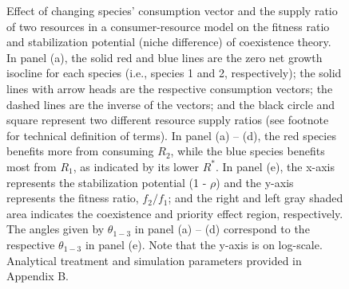 \newpage
\begin{figure}[h!]
	\centering
	\caption[Effect of changing species' consumption vector and the supply ratio of two resources in a consumer-resource model on the fitness ratio and stabilization potential of coexistence theory.]
		{\hspace{1mm}Effect of changing species' consumption vector and the supply ratio of two resources in a consumer-resource model on the fitness ratio and stabilization potential (niche difference) of coexistence theory. In panel (a), the solid red and blue lines are the zero net growth isocline for each species (i.e., species 1 and 2, respectively); the solid lines with arrow heads are the respective consumption vectors; the dashed lines are the inverse of the vectors; and the black circle and square represent two different resource supply ratios (see footnote for technical definition of terms). In panel (a) -- (d), the red species benefits more from consuming $R_{2}$, while the blue species benefits most from $R_{1}$, as indicated by its lower $R^{*}$. In panel (e), the x-axis represents the stabilization potential (1 - $\rho$) and the y-axis represents the fitness ratio, $f_{2}/f_{1}$; and the right and left gray shaded area indicates the coexistence and priority effect region, respectively. The angles given by $\theta_{1-3}$ in panel (a) -- (d) correspond to the respective $\theta_{1-3}$ in panel (e). Note that the y-axis is on log-scale. Analytical treatment and simulation parameters provided in Appendix B.}
	\label{fig:Fig1}
\end{figure}



